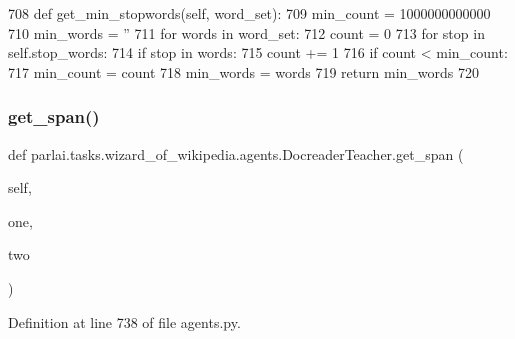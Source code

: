 \begin{DoxyCode}
708     \textcolor{keyword}{def }get\_min\_stopwords(self, word\_set):
709         min\_count = 1000000000000
710         min\_words = \textcolor{stringliteral}{''}
711         \textcolor{keywordflow}{for} words \textcolor{keywordflow}{in} word\_set:
712             count = 0
713             \textcolor{keywordflow}{for} stop \textcolor{keywordflow}{in} self.stop\_words:
714                 \textcolor{keywordflow}{if} stop \textcolor{keywordflow}{in} words:
715                     count += 1
716             \textcolor{keywordflow}{if} count < min\_count:
717                 min\_count = count
718                 min\_words = words
719         \textcolor{keywordflow}{return} min\_words
720 
\end{DoxyCode}
\mbox{\label{classparlai_1_1tasks_1_1wizard__of__wikipedia_1_1agents_1_1DocreaderTeacher_a4711260e72f13e7aab1f621030762847}} 
\subsubsection{\texorpdfstring{get\+\_\+span()}{get\_span()}}
{\footnotesize\ttfamily def parlai.\+tasks.\+wizard\+\_\+of\+\_\+wikipedia.\+agents.\+Docreader\+Teacher.\+get\+\_\+span (\begin{DoxyParamCaption}\item[{}]{self,  }\item[{}]{one,  }\item[{}]{two }\end{DoxyParamCaption})}



Definition at line 738 of file agents.\+py.


